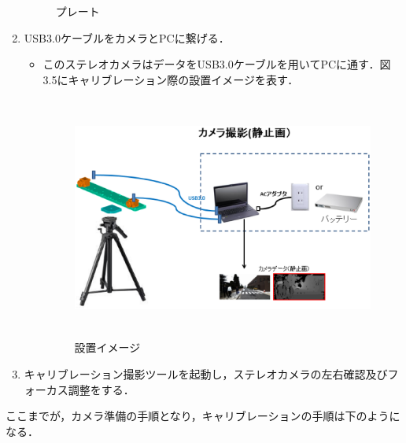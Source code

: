 \begin{enumerate}
\begin{figure}[htbp]
\begin{center}
   \caption{プレート}
   \label{プレート}
  \end{center}
\end{figure}
 \item USB3.0ケーブルをカメラとPCに繋げる．
  \begin{itemize}
      \item このステレオカメラはデータをUSB3.0ケーブルを用いてPCに通す．図3.5にキャリブレーション際の設置イメージを表す．
\begin{figure}[htbp]
  \begin{center}
   \includegraphics[height=80mm]{figure/設置イメージ.eps}
   \caption{設置イメージ}
   \label{設置イメージ}
  \end{center}
\end{figure}
 \end{itemize}
 \item キャリブレーション撮影ツールを起動し，ステレオカメラの左右確認及びフォーカス調整をする．
\end{enumerate}

ここまでが，カメラ準備の手順となり，キャリブレーションの手順は下のようになる．

